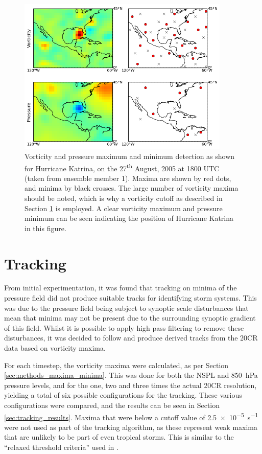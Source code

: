 \documentclass[pdftex,12pt,a4paper]{report}
\newcommand{\ts}{\textsuperscript}
\begin{document}
\begin{figure}[hb!]
    \centering
    \includegraphics[width=0.9\textwidth]{figures/katrina_max_mins}
    \caption{Vorticity and pressure maximum and minimum detection as shown for Hurricane Katrina,
        on the 27\ts{th} August, 2005 at 1800 UTC (taken from ensemble member 1). Maxima are shown
        by red dots, and minima by black crosses. The large number of vorticity maxima should be
        noted, which is why a vorticity cutoff as described in Section \ref{sec:tracking} is
        employed. A clear vorticity maximum and pressure minimum can be seen indicating the position
        of Hurricane Katrina in this figure.}
    \label{fig:katrina_max_mins}
\end{figure}

\section{Tracking}
\label{sec:tracking}

From initial experimentation, it was found that tracking on minima of the pressure field did not
produce suitable tracks for identifying storm systems. This was due to the pressure field being
subject to synoptic scale disturbances that mean that minima may not be present due to the
surrounding synoptic gradient of this field. Whilst it is possible to apply high pass filtering to
remove these disturbances, it was decided to follow \textcite{reed1988evaluation,
thorncroft2001african} and produce derived tracks from the 20CR data based on vorticity maxima.

For each timestep, the vorticity maxima were calculated, as per Section
\ref{sec:methods_maxima_minima}. This was done for both the NSPL and \SI{850}{hPa} pressure
levels, and for the one, two and three times the actual 20CR resolution, yielding a total of six
possible configurations for the tracking. These various configurations were compared, and the
results can be seen in Section \ref{sec:tracking_results}. Maxima that were below a cutoff value
of \SI{2.5e-5}{s^{-1}} were not used as part of the tracking algorithm, as these represent weak maxima
that are unlikely to be part of even tropical storms. This is similar to the ``relaxed threshold
criteria'' used in \textcite{camargo2002improving}.
\end{document}
